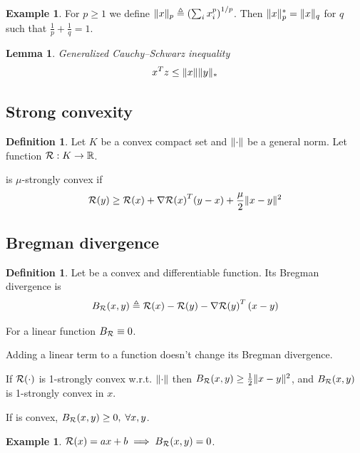 \documentclass[11pt]{article}
\newtheorem{lemma}[theorem]{Lemma}
\theoremstyle{definition}
\newtheorem{definition}[theorem]{Definition}
\theoremstyle{definition}
\newtheorem{example}[theorem]{Example}
\newcommand{\pth}[1]{\left( #1\right)}                 %
\newcommand{\wrt}{w.r.t.}
\newcommand{\strongcvx}[1]{#1-strongly convex}
\newcommand{\Kset}{\ensuremath{K}}
\begin{document}
\begin{example}
For $p \geq 1$ we define $ \norm{x}_p \triangleq \pth{\sum_i x_i^p}^{1/p} $. Then $\mathopen\| x \mathclose\|_p^* = \mathopen\| x \mathclose\|_q$ for $q$ such that $ \frac{1}{p} + \frac{1}{q} = 1 $.
\end{example}

\begin{lemma}
Generalized Cauchy–Schwarz inequality
\begin{equation*}
x^T z \leq \mathopen\| x \mathclose\| \mathopen\| y \mathclose\|_*
\end{equation*}
\end{lemma}

\subsection{Strong convexity}
\begin{definition}
Let \Kset{} be a convex compact set and $\mathopen\| \cdot \mathclose\|$ be a general norm. Let function $\R : \Kset \to \reals$.

\R{} is $\mu$-strongly convex if
\begin{equation*}
\mathcal R(y) \geq \mathcal R(x) + {\nabla\mathcal R(x)}^T (y-x) + \frac{\mu}{2} \mathopen\| x - y \mathclose\|^2
\end{equation*}

\end{definition}


\subsection{Bregman divergence}
\begin{definition}
Let \R{} be a convex and differentiable function. Its Bregman divergence is
\begin{equation*}
B_\R (x,y) \triangleq \R(x) - \R(y) - {\nabla \R(y)}^T \pth{x - y}
\end{equation*}
\end{definition}

For a linear function $ B_{\mathcal R} \equiv 0 $.

Adding a linear term to a function doesn't change its Bregman divergence.

If $ \mathcal R(\cdot) $ is \strongcvx{1} \wrt{} $ \mathopen\| \cdot \mathclose\| $ then $ B_{\mathcal R}(x,y) \geq \frac{1}{2} \mathopen\| x-y \mathclose\|^2 $, and $B_{\mathcal R}(x,y)$ is \strongcvx{1} in $x$.

If \R{} is convex, $ B_{\mathcal R}(x,y) \geq 0, \; \forall x,y$.

\begin{example}
$ \mathcal R(x) = a x + b
\implies
B_{\mathcal R}(x,y) = 0 $.
\end{example}
\end{document}
